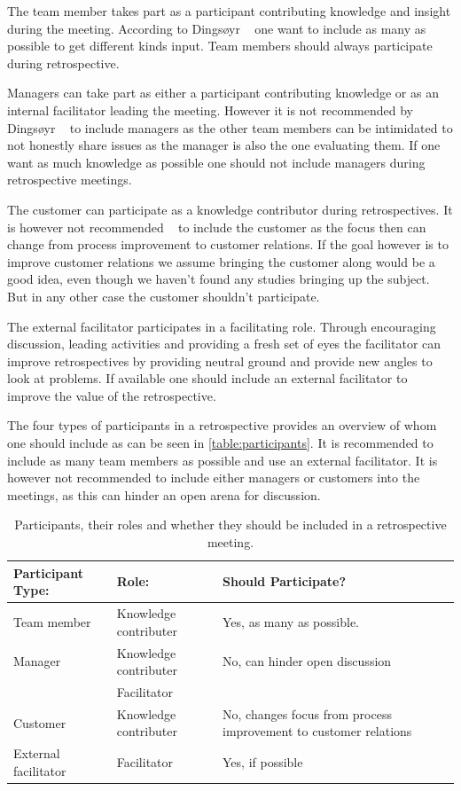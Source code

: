 \documentclass[12pt]{article}
\begin{document}
The team member takes part as a participant contributing knowledge and insight during the meeting. According to Dingsøyr ~\cite{Dingsoyr2005} one want to include as many as possible to get different kinds input. Team members should always participate during retrospective.

Managers can take part as either a participant contributing knowledge or as an internal facilitator leading the meeting. However it is not recommended by Dingsøyr ~\cite{Dingsoyr2005} to include managers as the other team members can be intimidated to not honestly share issues as the manager is also the one evaluating them. If one want as much knowledge as possible one should not include managers during retrospective meetings.

The customer can participate as a knowledge contributor during retrospectives. It is however not recommended ~\cite{Dingsoyr2005} to include the customer as the focus then can change from process improvement to customer relations. If the goal however is to improve customer relations we assume bringing the customer along would be a good idea, even though we haven't found any studies bringing up the subject. But in any other case the customer shouldn't participate.

The external facilitator participates in a facilitating role. Through encouraging discussion, leading activities and providing a fresh set of eyes the facilitator can improve retrospectives by providing neutral ground and provide new angles to look at problems. If available one should include an external facilitator to improve the value of the retrospective.

The four types of participants in a retrospective provides an overview of whom one should include as can be seen in \autoref{table:participants}. It is recommended to include as many team members as possible and use an external facilitator. It is however not recommended to include either managers or customers into the meetings, as this can hinder an open arena for discussion. 

\begin{table}[!h]
	\centering
	\captionsetup{justification=centering}
	\caption{Participants, their roles and whether they should be included in a retrospective meeting.}
	\label{table:participants}
	\begin{tabular}{llp{}}
		\hline
		Participant Type: & Role: & Should Participate?\\ \hline
		Team member & Knowledge contributer & Yes, as many as possible. \\
		Manager & Knowledge contributer & No, can hinder open discussion \\
		& Facilitator & \\ 
		Customer & Knowledge contributer & No, changes focus from process improvement to customer relations \\
		External facilitator & Facilitator & Yes, if possible \\ 
		\hline
	\end{tabular}
\end{table}
\end{document}
